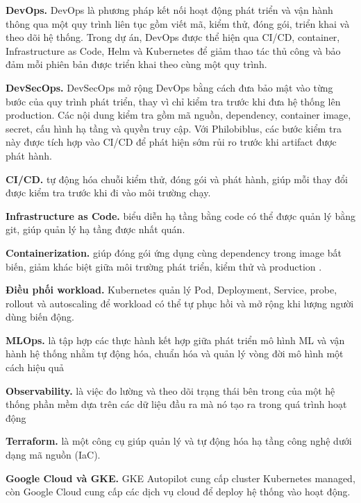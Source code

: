 
\textbf{DevOps.} DevOps là phương pháp kết nối hoạt động phát triển và vận hành thông qua một quy trình liên tục gồm viết mã, kiểm thử, đóng gói, triển khai và theo dõi hệ thống. Trong dự án, DevOps được thể hiện qua CI/CD, container, Infrastructure as Code, Helm và Kubernetes để giảm thao tác thủ công và bảo đảm mỗi phiên bản được triển khai theo cùng một quy trình.

\textbf{DevSecOps.} DevSecOps mở rộng DevOps bằng cách đưa bảo mật vào từng bước của quy trình phát triển, thay vì chỉ kiểm tra trước khi đưa hệ thống lên production. Các nội dung kiểm tra gồm mã nguồn, dependency, container image, secret, cấu hình hạ tầng và quyền truy cập. Với Philobiblus, các bước kiểm tra này được tích hợp vào CI/CD để phát hiện sớm rủi ro trước khi artifact được phát hành.

\textbf{CI/CD.} tự động hóa chuỗi kiểm thử, đóng gói và phát hành, giúp mỗi thay đổi được kiểm tra trước khi đi vào môi trường chạy.

\textbf{Infrastructure as Code.} biểu diễn hạ tầng bằng code có thể được quản lý bằng git, giúp quản lý hạ tầng được nhất quán.

\textbf{Containerization.} giúp đóng gói ứng dụng cùng dependency trong image bất biến, giảm khác biệt giữa môi trường phát triển, kiểm thử và production \cite{docker}.

\textbf{Điều phối workload.} Kubernetes quản lý Pod, Deployment, Service, probe, rollout và autoscaling để workload có thể tự phục hồi và mở rộng khi lượng người dùng biến động\cite{kubernetes}.

\textbf{MLOps.} là tập hợp các thực hành kết hợp giữa phát triển mô hình ML và vận hành hệ thống nhằm tự động hóa, chuẩn hóa và quản lý vòng đời mô hình một cách hiệu quả

\textbf{Observability.} là việc đo lường và theo dõi trạng thái bên trong của một hệ thống phần mềm dựa trên các dữ liệu đầu ra mà nó tạo ra trong quá trình hoạt động

\textbf{Terraform.} là một công cụ giúp quản lý và tự động hóa hạ tầng công nghệ dưới dạng mã nguồn (IaC).

\textbf{Google Cloud và GKE.} GKE Autopilot cung cấp cluster Kubernetes managed, còn Google Cloud cung cấp các dịch vụ cloud để deploy hệ thống vào hoạt động.

